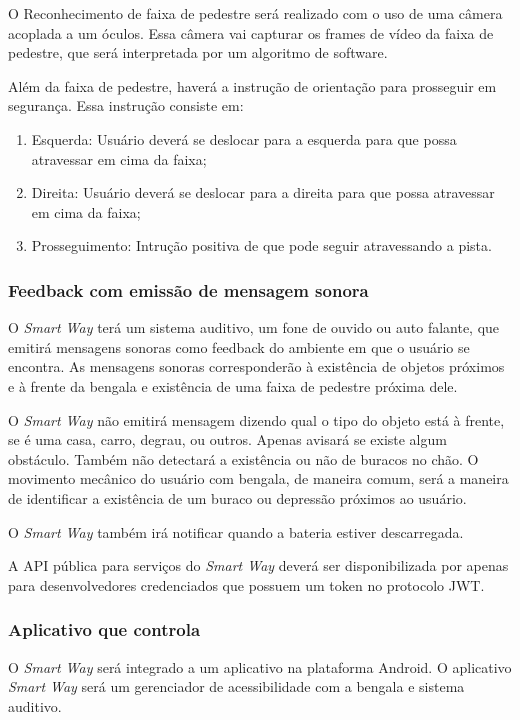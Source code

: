 O Reconhecimento de faixa de pedestre será realizado com o uso de uma câmera acoplada a um óculos. Essa câmera vai capturar os frames de vídeo da faixa de pedestre, que será interpretada por um algoritmo de software.

Além da faixa de pedestre, haverá a instrução de orientação para prosseguir em segurança. Essa instrução consiste em:
\begin{enumerate}
    \item Esquerda: Usuário deverá se deslocar para a esquerda para que possa atravessar em cima da faixa;
    \item Direita: Usuário deverá se deslocar para a direita para que possa atravessar em cima da faixa;
    \item Prosseguimento: Intrução positiva de que pode seguir atravessando a pista.
\end{enumerate}

\subsubsection{Feedback com emissão de mensagem sonora}

O \textit{Smart Way} terá um sistema auditivo, um fone de ouvido ou auto falante, que emitirá mensagens sonoras como feedback do ambiente em que o usuário se encontra. As mensagens sonoras corresponderão à existência de objetos próximos e à frente da bengala e existência de uma faixa de pedestre próxima dele.

O \textit{Smart Way} não emitirá mensagem dizendo qual o tipo do objeto está à frente, se é uma casa, carro, degrau, ou outros. Apenas avisará se existe algum obstáculo. Também não detectará a existência ou não de buracos no chão. O movimento mecânico do usuário com  bengala, de maneira comum, será a maneira de identificar a existência de um buraco ou depressão próximos ao usuário.

O \textit{Smart Way} também irá notificar quando a bateria estiver descarregada.

A API pública para serviços do \textit{Smart Way} deverá ser disponibilizada por apenas para desenvolvedores credenciados que possuem um token no protocolo JWT.

\subsubsection{Aplicativo que controla}

O \textit{Smart Way} será integrado a um aplicativo na plataforma Android. O aplicativo \textit{Smart Way} será um gerenciador de acessibilidade com a bengala e sistema auditivo.


